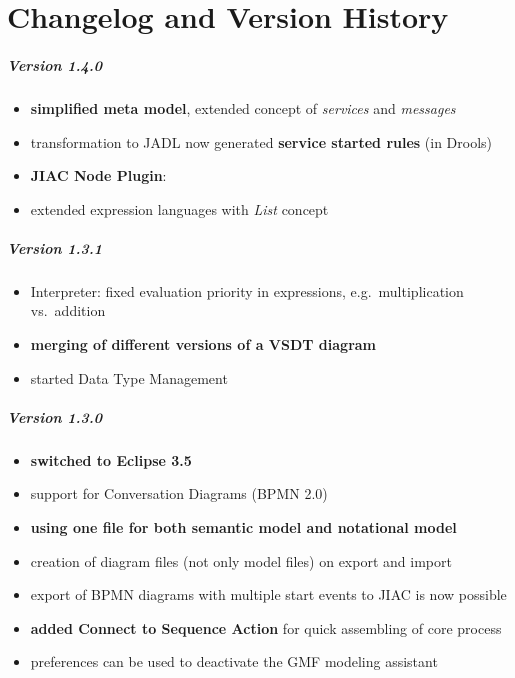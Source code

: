 \chapter{Changelog and Version History}
\label{sec:changelog}


\paragraph{Version 1.4.0}

\begin{itemize}
	\item \textbf{simplified meta model}, extended concept of \emph{services} and \emph{messages}
	\item transformation to JADL now generated \textbf{service started rules} (in Drools)
	\item \textbf{JIAC Node Plugin}: 
	\item extended expression languages with \emph{List} concept
\end{itemize}

\paragraph{Version 1.3.1}
\begin{itemize}
	\item Interpreter: fixed evaluation priority in expressions, e.g.\ multiplication vs.\ addition
	\item \textbf{merging of different versions of a VSDT diagram}
	\item started Data Type Management
\end{itemize}

\paragraph{Version 1.3.0}
\begin{itemize}
	\item \textbf{switched to Eclipse 3.5}
	\item support for Conversation Diagrams (BPMN 2.0)
	\item \textbf{using one file for both semantic model and notational model}
	\item creation of diagram files (not only model files) on export and import
	\item export of BPMN diagrams with multiple start events to JIAC is now possible
	\item \textbf{added Connect to Sequence Action} for quick assembling of core process
	\item preferences can be used to deactivate the GMF modeling assistant
\end{itemize}

